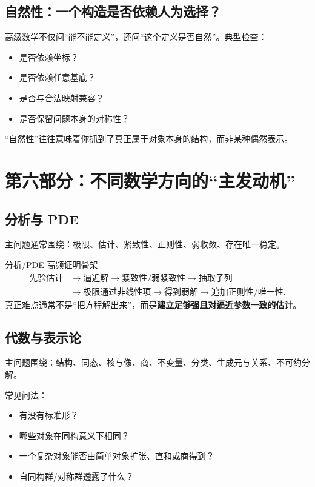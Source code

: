 \documentclass[11pt,a4paper]{ctexart}
\begin{document}
\subsection{自然性：一个构造是否依赖人为选择？}
高级数学不仅问“能不能定义”，还问“这个定义是否自然”。典型检查：
\begin{itemize}
  \item 是否依赖坐标？
  \item 是否依赖任意基底？
  \item 是否与合法映射兼容？
  \item 是否保留问题本身的对称性？
\end{itemize}
“自然性”往往意味着你抓到了真正属于对象本身的结构，而非某种偶然表示。

\section{第六部分：不同数学方向的“主发动机”}

\subsection{分析与 PDE}
主问题通常围绕：极限、估计、紧致性、正则性、弱收敛、存在唯一稳定。

\begin{corebox}{分析/PDE 高频证明骨架}
\[
\begin{aligned}
\text{先验估计}&\to\text{逼近解}\to\text{紧致性/弱紧致性}\to\text{抽取子列}\\
&\to\text{极限通过非线性项}\to\text{得到弱解}\to\text{追加正则性/唯一性}.
\end{aligned}
\]
真正难点通常不是“把方程解出来”，而是\textbf{建立足够强且对逼近参数一致的估计}。
\end{corebox}

\subsection{代数与表示论}
主问题围绕：结构、同态、核与像、商、不变量、分类、生成元与关系、不可约分解。

常见问法：
\begin{itemize}
  \item 有没有标准形？
  \item 哪些对象在同构意义下相同？
  \item 一个复杂对象能否由简单对象扩张、直和或商得到？
  \item 自同构群/对称群透露了什么？
\end{itemize}
\end{document}
